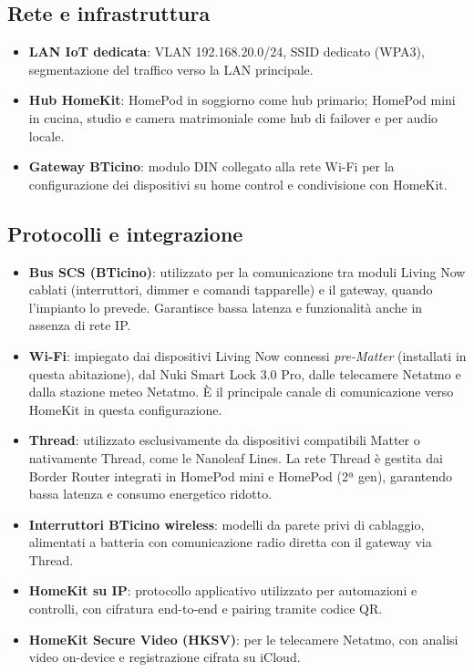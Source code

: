 \subsection{Rete e infrastruttura}
\begin{itemize}
  \item \textbf{LAN IoT dedicata}: VLAN 192.168.20.0/24, SSID dedicato (WPA3), segmentazione del traffico verso la LAN principale.
  \item \textbf{Hub HomeKit}: HomePod in soggiorno come hub primario; HomePod mini in cucina, studio e camera matrimoniale come hub di failover e per audio locale.
  \item \textbf{Gateway BTicino}: modulo DIN collegato alla rete Wi-Fi per la configurazione dei dispositivi su home control e condivisione con HomeKit.
\end{itemize}

\subsection{Protocolli e integrazione}
\begin{itemize}
  \item \textbf{Bus SCS (BTicino)}: utilizzato per la comunicazione tra moduli Living Now cablati (interruttori, dimmer e comandi tapparelle) e il gateway, quando l’impianto lo prevede. Garantisce bassa latenza e funzionalità anche in assenza di rete IP.
  \item \textbf{Wi-Fi}: impiegato dai dispositivi Living Now connessi \textit{pre-Matter} (installati in questa abitazione), dal Nuki Smart Lock 3.0 Pro, dalle telecamere Netatmo e dalla stazione meteo Netatmo. È il principale canale di comunicazione verso HomeKit in questa configurazione.
  \item \textbf{Thread}: utilizzato esclusivamente da dispositivi compatibili Matter o nativamente Thread, come le Nanoleaf Lines. La rete Thread è gestita dai Border Router integrati in HomePod mini e HomePod (2ª gen), garantendo bassa latenza e consumo energetico ridotto.
  \item \textbf{Interruttori BTicino wireless}: modelli da parete privi di cablaggio, alimentati a batteria con comunicazione radio diretta con il gateway via Thread.
  \item \textbf{HomeKit su IP}: protocollo applicativo utilizzato per automazioni e controlli, con cifratura end-to-end e pairing tramite codice QR.
  \item \textbf{HomeKit Secure Video (HKSV)}: per le telecamere Netatmo, con analisi video on-device e registrazione cifrata su iCloud.
\end{itemize}

